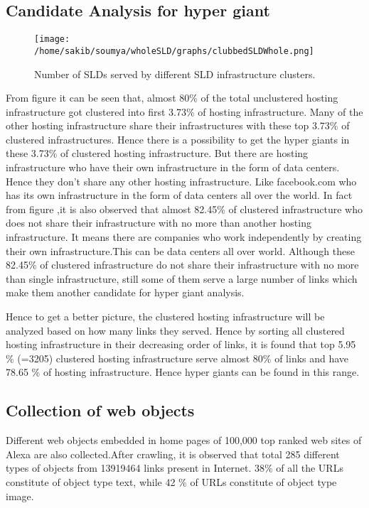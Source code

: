 \subsection{Candidate Analysis for hyper giant}
\begin{figure}[h]
\texttt{[image: /home/sakib/soumya/wholeSLD/graphs/clubbedSLDWhole.png]}
\centering
\caption{Number of SLDs served by different SLD infrastructure clusters.}
\end{figure}

From figure it can be seen that, almost 80\% of the total unclustered hosting infrastructure got clustered into first 3.73\% of hosting infrastructure. Many of the other hosting infrastructure share their infrastructures with these top 3.73\% of clustered infrastructures. Hence there is a possibility to get the hyper giants in these 3.73\% of clustered hosting infrastructure. But there are hosting infrastructure who have their own infrastructure in the form of data centers. Hence they don't share any other hosting infrastructure. Like facebook.com who has its own infrastructure in the form of data centers all over the world. In fact from figure ,it is also observed that almost 82.45\% of clustered infrastructure who does not share their infrastructure with no more than another hosting infrastructure. It means there are companies who work independently by creating their own infrastructure.This can be data centers all over world. Although these 82.45\% of clustered infrastructure do not share their infrastructure with no more than single infrastructure, still some of them serve a large number of links which make them another candidate for hyper giant analysis.

Hence to get a better picture, the clustered hosting infrastructure will be analyzed based on how many links they served. Hence by sorting all clustered hosting infrastructure in their decreasing order of links, it is found that top 5.95 \% (=3205) clustered hosting infrastructure serve almost 80\% of links and have 78.65 \% of hosting infrastructure. Hence hyper giants can be found in this range.

\subsection{Collection of web objects}
Different web objects embedded in home pages of 100,000 top ranked web sites of Alexa are also collected.After crawling, it is observed that total 285 different types of objects from 13919464 links present in Internet. 38\% of all the URLs constitute of object type text, while 42 \% of URLs constitute of object type image.

